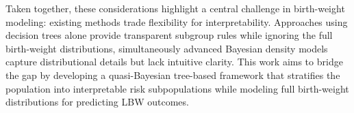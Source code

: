 Taken together, these considerations highlight a central challenge in birth-weight modeling: existing methods trade flexibility for interpretability. Approaches using decision trees alone provide transparent subgroup rules while ignoring the full birth-weight distributions, simultaneously advanced Bayesian density models capture distributional details but lack intuitive clarity. This work aims to bridge the gap by developing a quasi-Bayesian tree-based framework that stratifies the population into interpretable risk subpopulations while modeling full birth-weight distributions for predicting LBW outcomes. 

